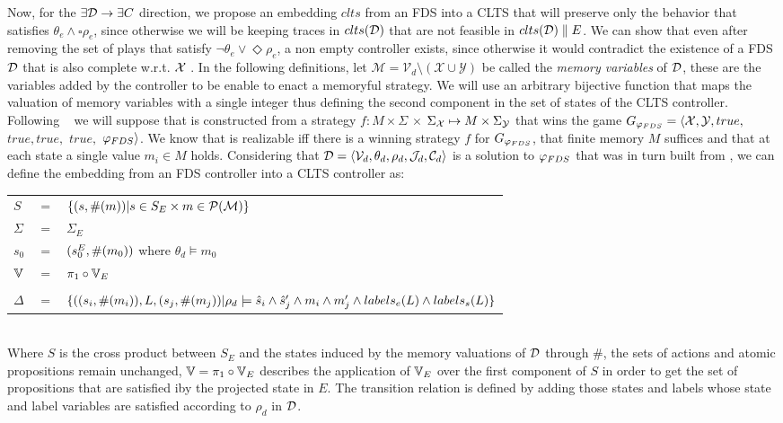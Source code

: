 Now,  for the $\exists \mathcal{D} \rightarrow \exists C$ direction, we propose an embedding $clts$ from an FDS into a CLTS that will preserve only the behavior that satisfies $\theta_e \wedge \square \rho_e$, since otherwise we will be keeping traces in $clts(\mathcal{D})$ that are not feasible in $clts(\mathcal{D})\parallel E$. We can show that even after removing the set of plays that satisfy $\neg \theta_e \vee \Diamond \rho_e$, a non empty controller exists, since otherwise it would contradict the existence of a FDS $\mathcal{D}$ that is also complete w.r.t. ${\mathcal{X}}$ . In the following definitions, let $\mathcal{M}= \mathcal{V}_d\setminus (\mathcal{X} \cup \mathcal{Y})$ be called the \emph{memory variables} of $\mathcal{D}$, these are the variables added by the controller to be enable to enact a memoryful strategy. We will use an arbitrary bijective function \enumSetDef that maps the valuation of memory variables with a single integer thus defining the second component in the set of states of the CLTS controller. 
Following ~\cite{bloem2012synthesis} we will suppose that \fdsD is constructed from a strategy $f: M \times \Sigma$ $\times$ $\Sigma_{{\mathcal{X}}} \mapsto M \times \Sigma_{{\mathcal{Y}}}$
that wins the game $G_{\varphi_{FDS}}=\langle {\mathcal{X}}, {\mathcal{Y}}, true,$ $true, true,$ $true,$ $\varphi_{FDS} \rangle$. We know  that \varphiLTL is realizable iff there is a winning strategy $f$ for $G_{\varphi_{FDS}}$, that finite memory $M$ suffices and that at each state a single value $m_i \in M$ holds.
Considering that $\mathcal{D}= \langle \mathcal{V}_d, \theta_d, \rho_d, \mathcal{J}_d, \mathcal{C}_d\rangle$ is a solution to $\varphi_{FDS}$ that was in turn built from \controlProblemDef,  we can define the embedding from an FDS controller \fdsD into a CLTS controller \cltsEmbeddingDef{\fdsD}  as:

\vspace{1em}
\begin{tabular}{ l c l }
	$S$ &$=$& $\{(s,\#(m)) | s \in S_E \times m \in \mathcal{P}(\mathcal{M}) \}$\\
	$\Sigma$ &$=$&$\Sigma_E$\\	
	$s_0$&$=$&$(s_0^{E}, \#(m_0))$ where $\theta_d \models m_0$ \\
	$\mathbb{V}$&$=$&$\pi_1 \circ \mathbb{V}_E$\\
	&&\\
	$\Delta$&$=$&$\{((s_i,\#(m_i)),L,(s_j,\#(m_j))| \rho_d \models \hat{s}_{i} \wedge \hat{s}_{j}' \wedge m_i \wedge m_j' \wedge labels_e(L) \wedge labels_s(L) \}$\\
\end{tabular}
\vspace{1em}
\\
Where $S$ is the cross product between $S_E$ and the states induced by the memory valuations of $\mathcal{D}$ through $\#$, the sets of actions and atomic propositions remain unchanged, $\mathbb{V}=\pi_1 \circ \mathbb{V}_E$ describes the application of $\mathbb{V}_E$ over the first component of $S$ in order to get the set of propositions that are satisfied iby the projected state in $E$. The transition relation is defined by adding those states and labels whose state and label variables are satisfied according to $\rho_d$ in $\mathcal{D}$.

